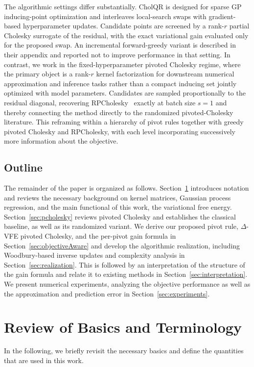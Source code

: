 \documentclass[onefignum,onetabnum]{siamart250211}
\begin{document}
The algorithmic settings differ substantially. CholQR is designed for sparse GP inducing-point optimization and interleaves local-search swaps with gradient-based hyperparameter updates. Candidate points are screened by a rank-$r$ partial Cholesky surrogate of the residual, with the exact variational gain evaluated only for the proposed swap. An incremental forward-greedy variant is described in their appendix and reported not to improve performance in that setting. In contrast, we work in the fixed-hyperparameter pivoted Cholesky regime, where the primary object is a rank-$r$ kernel factorization for downstream numerical approximation and inference tasks rather than a compact inducing set jointly optimized with model parameters. Candidates are sampled proportionally to the residual diagonal, recovering RPCholesky~\cite{chen.2025} exactly at batch size $s=1$ and thereby connecting the method directly to the randomized pivoted-Cholesky literature. This reframing within a hierarchy of pivot rules together with greedy pivoted Cholesky and RPCholesky, with each level incorporating successively more information about the objective.


\subsection{Outline}
The remainder of the paper is organized as follows. Section~\ref{sec:basics} introduces notation and reviews the necessary background on kernel matrices, Gaussian process regression, and the main functional of this work, the variational free energy. Section~\ref{sec:pcholesky} reviews pivoted Cholesky and establishes the classical baseline, as well as its randomized variant. We derive our proposed pivot rule, $\Delta$-VFE pivoted Cholesky, and the per-pivot gain formula in Section~\ref{sec:objectiveAware} and  develop the algorithmic realization, including Woodbury-based inverse updates and complexity analysis in Section~\ref{sec:realization}. This is followed by an interpretation of the structure of the gain formula and relate it to existing methods in Section~\ref{sec:interpretation}. We present numerical experiments, analyzing the objective performance as well as the approximation and prediction error in Section~\ref{sec:experiments}.
\section{Review of Basics and Terminology}\label{sec:basics}
In the following, we briefly revisit the necessary basics and define the quantities that are used in this work. 
\end{document}
